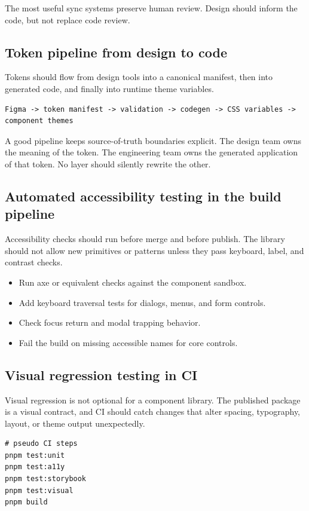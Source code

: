 The most useful sync systems preserve human review. Design should inform the code, but not replace code review.

\subsection{Token pipeline from design to code}
Tokens should flow from design tools into a canonical manifest, then into generated code, and finally into runtime theme variables.

\begin{verbatim}
Figma -> token manifest -> validation -> codegen -> CSS variables -> component themes
\end{verbatim}

A good pipeline keeps source-of-truth boundaries explicit. The design team owns the meaning of the token. The engineering team owns the generated application of that token. No layer should silently rewrite the other.

\subsection{Automated accessibility testing in the build pipeline}
Accessibility checks should run before merge and before publish. The library should not allow new primitives or patterns unless they pass keyboard, label, and contrast checks.

\begin{itemize}[leftmargin=*, itemsep=0.35em]
  \item Run axe or equivalent checks against the component sandbox.
  \item Add keyboard traversal tests for dialogs, menus, and form controls.
  \item Check focus return and modal trapping behavior.
  \item Fail the build on missing accessible names for core controls.
\end{itemize}

\subsection{Visual regression testing in CI}
Visual regression is not optional for a component library. The published package is a visual contract, and CI should catch changes that alter spacing, typography, layout, or theme output unexpectedly.

\begin{verbatim}
# pseudo CI steps
pnpm test:unit
pnpm test:a11y
pnpm test:storybook
pnpm test:visual
pnpm build
\end{verbatim}

